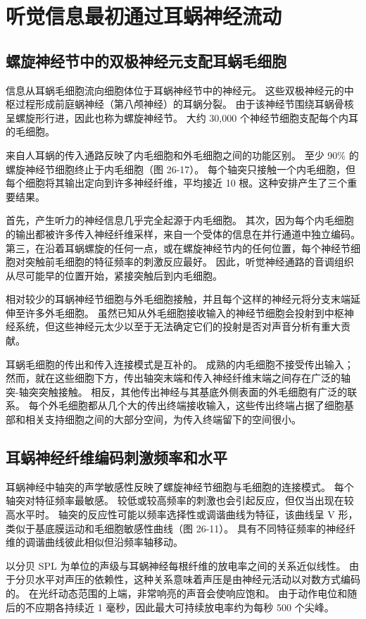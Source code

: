 \section{听觉信息最初通过耳蜗神经流动}
\subsection{螺旋神经节中的双极神经元支配耳蜗毛细胞}
信息从耳蜗毛细胞流向细胞体位于耳蜗神经节中的神经元。 这些双极神经元的中枢过程形成前庭蜗神经（第八颅神经）的耳蜗分裂。 由于该神经节围绕耳蜗骨核呈螺旋形行进，因此也称为螺旋神经节。 大约 30,000 个神经节细胞支配每个内耳的毛细胞。

来自人耳蜗的传入通路反映了内毛细胞和外毛细胞之间的功能区别。 至少 90\% 的螺旋神经节细胞终止于内毛细胞（图 26-17）。 每个轴突只接触一个内毛细胞，但每个细胞将其输出定向到许多神经纤维，平均接近 10 根。这种安排产生了三个重要结果。

首先，产生听力的神经信息几乎完全起源于内毛细胞。 其次，因为每个内毛细胞的输出都被许多传入神经纤维采样，来自一个受体的信息在并行通道中独立编码。 第三，在沿着耳蜗螺旋的任何一点，或在螺旋神经节内的任何位置，每个神经节细胞对突触前毛细胞的特征频率的刺激反应最好。 因此，听觉神经通路的音调组织从尽可能早的位置开始，紧接突触后到内毛细胞。

相对较少的耳蜗神经节细胞与外毛细胞接触，并且每个这样的神经元将分支末端延伸至许多外毛细胞。 虽然已知从外毛细胞接收输入的神经节细胞会投射到中枢神经系统，但这些神经元太少以至于无法确定它们的投射是否对声音分析有重大贡献。

耳蜗毛细胞的传出和传入连接模式是互补的。 成熟的内毛细胞不接受传出输入； 然而，就在这些细胞下方，传出轴突末端和传入神经纤维末端之间存在广泛的轴突-轴突突触接触。 相反，其他传出神经与其基底外侧表面的外毛细胞有广泛的联系。 每个外毛细胞都从几个大的传出终端接收输入，这些传出终端占据了细胞基部和相关支持细胞之间的大部分空间，为传入终端留下的空间很小。



\subsection{耳蜗神经纤维编码刺激频率和水平}
耳蜗神经中轴突的声学敏感性反映了螺旋神经节细胞与毛细胞的连接模式。 每个轴突对特征频率最敏感。 较低或较高频率的刺激也会引起反应，但仅当出现在较高水平时。 轴突的反应性可能以频率选择性或调谐曲线为特征，该曲线呈 V 形，类似于基底膜运动和毛细胞敏感性曲线（图 26-11）。 具有不同特征频率的神经纤维的调谐曲线彼此相似但沿频率轴移动。

以分贝 SPL 为单位的声级与耳蜗神经每根纤维的放电率之间的关系近似线性。 由于分贝水平对声压的依赖性，这种关系意味着声压是由神经元活动以对数方式编码的。 在光纤动态范围的上端，非常响亮的声音会使响应饱和。 由于动作电位和随后的不应期各持续近 1 毫秒，因此最大可持续放电率约为每秒 500 个尖峰。

